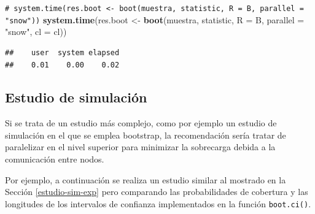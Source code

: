 \documentclass[
]{book}
\newenvironment{Shaded}{\begin{snugshade}}{\end{snugshade}}
\newcommand{\AttributeTok}[1]{\textcolor[rgb]{0.13,0.29,0.53}{#1}}
\newcommand{\CommentTok}[1]{\textcolor[rgb]{0.56,0.35,0.01}{\textit{#1}}}
\newcommand{\FunctionTok}[1]{\textcolor[rgb]{0.13,0.29,0.53}{\textbf{#1}}}
\newcommand{\NormalTok}[1]{#1}
\newcommand{\OtherTok}[1]{\textcolor[rgb]{0.56,0.35,0.01}{#1}}
\newcommand{\StringTok}[1]{\textcolor[rgb]{0.31,0.60,0.02}{#1}}
\theoremstyle{break}
\theoremstyle{nonumberplain}
\renewcommand{\CommentTok}[1]{\textcolor[rgb]{0.41,0.41,0.41}{\texttt{#1}}}
\begin{document}
\begin{Shaded}
\begin{Highlighting}[]
\CommentTok{\# system.time(res.boot \textless{}{-} boot(muestra, statistic, R = B, parallel = "snow"))}
\FunctionTok{system.time}\NormalTok{(res.boot }\OtherTok{\textless{}{-}} \FunctionTok{boot}\NormalTok{(muestra, statistic, }\AttributeTok{R =}\NormalTok{ B, }\AttributeTok{parallel =} \StringTok{"snow"}\NormalTok{, }\AttributeTok{cl =}\NormalTok{ cl))}
\end{Highlighting}
\end{Shaded}

\begin{verbatim}
##    user  system elapsed 
##    0.01    0.00    0.02
\end{verbatim}

\subsection{Estudio de simulación}\label{estudio-sim-boot}

Si se trata de un estudio más complejo, como por ejemplo un estudio de simulación
en el que se emplea bootstrap, la recomendación sería tratar de paralelizar
en el nivel superior para minimizar la sobrecarga debida a la comunicación
entre nodos.

Por ejemplo, a continuación se realiza un estudio similar al mostrado en la Sección \ref{estudio-sim-exp}
pero comparando las probabilidades de cobertura y las longitudes de los
intervalos de confianza implementados en la función \texttt{boot.ci()}.
\end{document}
